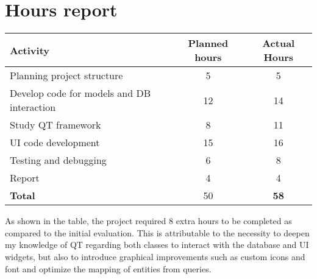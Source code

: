 \documentclass[10pt]{article}
\begin{document}
\section{Hours report}
\begin{table}[h]
    \centering
    \begin{tabular}{|l|c|c|}
        \hline
        \textbf{Activity}                          & \textbf{Planned hours} & \textbf{Actual Hours} \\\hline
        Planning project structure                 & 5                      & 5                     \\
        Develop code for models and DB interaction & 12                     & 14                    \\
        Study QT framework                         & 8                      & 11                    \\
        UI code development                        & 15                     & 16                    \\
        Testing and debugging                      & 6                      & 8                     \\
        Report                                     & 4                      & 4                     \\\hline
        \textbf{Total}                             & 50                     & \textbf{58}           \\\hline
    \end{tabular}
\end{table}
As shown in the table, the project required 8 extra hours to be completed as
compared to the initial evaluation. This is attributable to the necessity to
deepen my knowledge of QT regarding both classes to interact with the database
and UI widgets, but also to introduce graphical improvements such as custom
icons and font and optimize the mapping of entities from queries.
\end{document}
